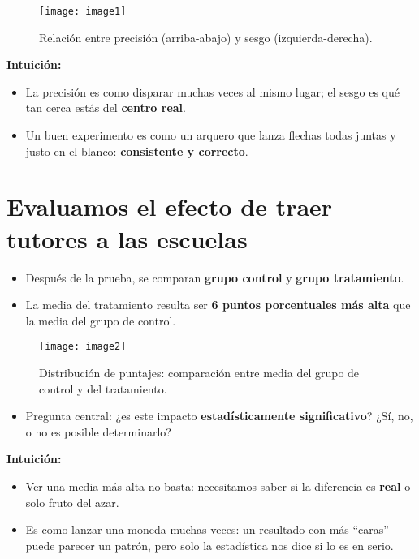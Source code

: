 \documentclass[12pt]{article}
\begin{document}
\begin{figure}[H]
\centering
\texttt{[image: image1]}
\caption{\footnotesize Relación entre precisión (arriba-abajo) y sesgo (izquierda-derecha).}
\end{figure}

\textbf{Intuición:}
\begin{itemize}
    \item La precisión es como disparar muchas veces al mismo lugar; el sesgo es qué tan cerca estás del \textbf{centro real}.
    \item Un buen experimento es como un arquero que lanza flechas todas juntas y justo en el blanco: \textbf{consistente y correcto}.
\end{itemize}

\section*{\noindent\textbf{Evaluamos el efecto de traer tutores a las escuelas}}

\begin{itemize}
    \item Después de la prueba, se comparan \textbf{grupo control} y \textbf{grupo tratamiento}.
    \item La media del tratamiento resulta ser \textbf{6 puntos porcentuales más alta} que la media del grupo de control.
\end{itemize}

\begin{figure}[h!]
\centering
\texttt{[image: image2]}
\caption{\footnotesize Distribución de puntajes: comparación entre media del grupo de control y del tratamiento.}
\end{figure}

\begin{itemize}
    \item Pregunta central: ¿es este impacto \textbf{estadísticamente significativo}?  
    ¿Sí, no, o no es posible determinarlo?
\end{itemize}

\textbf{Intuición:}
\begin{itemize}
    \item Ver una media más alta no basta: necesitamos saber si la diferencia es \textbf{real} o solo fruto del azar.
    \item Es como lanzar una moneda muchas veces: un resultado con más “caras” puede parecer un patrón, pero solo la estadística nos dice si lo es en serio.
\end{itemize}
\end{document}
